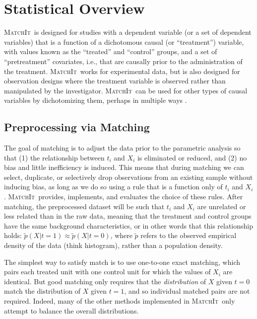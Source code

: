 \documentclass[oneside,letterpaper,titlepage]{article}
\newcommand{\MatchIt}{\textsc{MatchIt}}
\begin{document}

\section{Statistical Overview}

\MatchIt\ is designed for studies with a dependent variable (or a set
of dependent variables) that is a function of a dichotomous causal (or
``treatment'') variable, with values known as the ``treated'' and
``control'' groups, and a set of ``pretreatment'' covariates, i.e.,
that are causally prior to the administration of the treatment.
\MatchIt\ works for experimental data, but is also designed for
observation designs where the treatment variable is observed rather
than manipulated by the investigator.  \MatchIt\ can be used for other
types of causal variables by dichotomizing them, perhaps in multiple
ways \citep[see also][]{ImaDyk04}.

\subsection{Preprocessing via Matching}

The goal of matching is to adjust the data prior to the parametric
analysis so that (1) the relationship between $t_i$ and $X_i$ is
eliminated or reduced, and (2) no bias and little inefficiency is
induced.  This means that during matching we can select, duplicate, or
selectively drop observations from an existing sample without inducing
bias, as long as we do so using a rule that is a function only of
$t_i$ and $X_i$.  \MatchIt\ provides, implements, and evaluates the
choice of these rules.  After matching, the preprocessed dataset will
be such that $t_i$ and $X_i$ are unrelated or less related than in the
raw data, meaning that the treatment and control groups have the same
background characteristics, or in other words that this relationship
holds: $\tilde p(X|t=1) \approx \tilde p(X|t=0)$, where $\tilde p$
refers to the observed empirical density of the data (think
histogram), rather than a population density.  

The simplest way to satisfy match is to use one-to-one exact matching,
which pairs each treated unit with one control unit for which the
values of $X_i$ are identical.  But good matching only requires that
the \emph{distribution} of $X$ given $t=0$ match the distribution of
$X$ given $t=1$, and so individual matched pairs are not required.
Indeed, many of the other methods implemented in \MatchIt\ only
attempt to balance the overall distributions.
  
\end{document}
